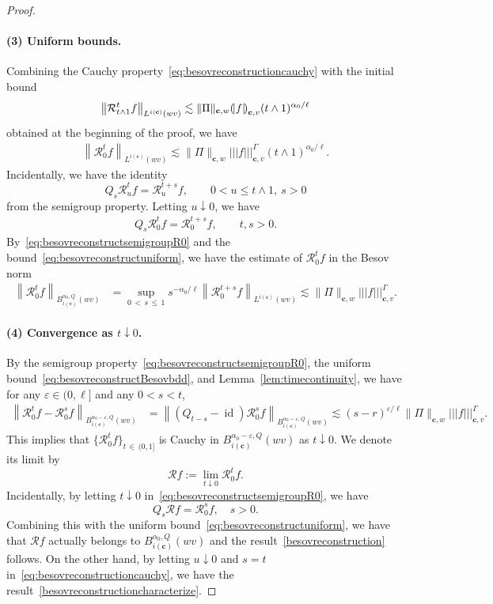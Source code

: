 \documentclass[10pt]{amsart}
\theoremstyle{definition}
\numberwithin{equation}{section}
\newcommand{\bfc}{\mathbf{c}}
\newcommand{\mcR}{\mathcal{R}}
\DeclareMathOperator{\id}{id}
\newcommand{\tri}{|\!|\!|}
\newcommand{\llparenthesis}{\mathopen{(\mkern -2.7mu|}}
\newcommand{\rrparenthesis}{\mathclose{|\mkern -2.7mu)}}
\newcommand{\lp}{\llparenthesis}
\newcommand{\rp}{\rrparenthesis}
\begin{document}
\begin{proof}
\paragraph*{(3) Uniform bounds.} Combining the Cauchy property~\eqref{eq:besovreconstructioncauchy} with the initial bound
\[
\left\|\mcR_{t\wedge1}^tf\right\|_{L^{i(\bfc)}(wv)}\lesssim\|\Pi\|_{\bfc,w}\lp f\rp_{\bfc,v}(t\wedge1)^{\alpha_0/\ell}
\]
obtained at the beginning of the proof, we have
\begin{align}\label{eq:besovreconstructuniform}
\left\|\mcR_0^tf\right\|_{L^{i(\bfc)}(wv)}
\lesssim\|\Pi\|_{\bfc,w}\tri f \tri_{\bfc,v}^\Gamma(t\wedge1)^{\alpha_0/\ell}.
\end{align}
Incidentally, we have the identity
\[
Q_s\mcR_u^tf=\mcR_u^{t+s}f,\qquad 0<u\le t\wedge1,\ s>0
\]
from the semigroup property. Letting $u\downarrow0$, we have
\begin{align}\label{eq:besovreconstructsemigroupR0}
Q_s\mcR_0^tf=\mcR_0^{t+s}f,\qquad t,s>0.
\end{align}
By~\eqref{eq:besovreconstructsemigroupR0} and the bound~\eqref{eq:besovreconstructuniform}, we have the estimate of $\mcR_0^tf$ in the Besov norm
\begin{align}\label{eq:besovreconstructBesovbdd}
\left\|\mcR_0^tf\right\|_{B_{i(\bfc)}^{\alpha_0,Q}(wv)} &=\sup_{0\,<\,s\,\le\,1}s^{-\alpha_0/\ell}\left\|\mcR_0^{t+s}f\right\|_{L^{i(\bfc)}(wv)}
\lesssim\|\Pi\|_{\bfc,w}\tri f \tri_{\bfc,v}^\Gamma.
\end{align}


\paragraph*{(4) Convergence as $t\downarrow0$.}
By the semigroup property~\eqref{eq:besovreconstructsemigroupR0}, the uniform bound~\eqref{eq:besovreconstructBesovbdd}, and Lemma~\ref{lem:timecontinuity}, we have for any $\varepsilon\in(0,\ell]$ and any $0<s<t$,
\begin{align*}
\left\|\mcR_0^tf-\mcR_0^sf\right\|_{B_{i(\bfc)}^{\alpha_0-\varepsilon,Q}(wv)} &=\left\|(Q_{t-s}-\id)\mcR_0^sf\right\|_{B_{i(\bfc)}^{\alpha_0-\varepsilon,Q}(wv)}
\lesssim(s-r)^{\varepsilon/\ell}\|\Pi\|_{\bfc,w}\tri f \tri_{\bfc,v}^\Gamma.
\end{align*}
This implies that $\{\mcR_0^tf\}_{t\,\in\,(0,1]}$ is Cauchy in $B_{i(\bfc)}^{\alpha_0-\varepsilon,Q}(wv)$ as $t\downarrow0$. We denote its limit by
\[
\mcR f:=\lim_{t\downarrow0}\mcR_0^tf.
\]
Incidentally, by letting $t\downarrow0$ in~\eqref{eq:besovreconstructsemigroupR0}, we have
\[
Q_s\mcR f=\mcR_0^sf,\quad s>0.
\]
Combining this with the uniform bound~\eqref{eq:besovreconstructuniform}, we have that $\mcR f$ actually belongs to $B_{i(\bfc)}^{\alpha_0,Q}(wv)$ and the result~\eqref{besovreconstruction} follows. On the other hand, by letting $u\downarrow0$ and $s=t$ in~\eqref{eq:besovreconstructioncauchy}, we have the result~\eqref{besovreconstructioncharacterize}.


\end{proof}
\end{document}
